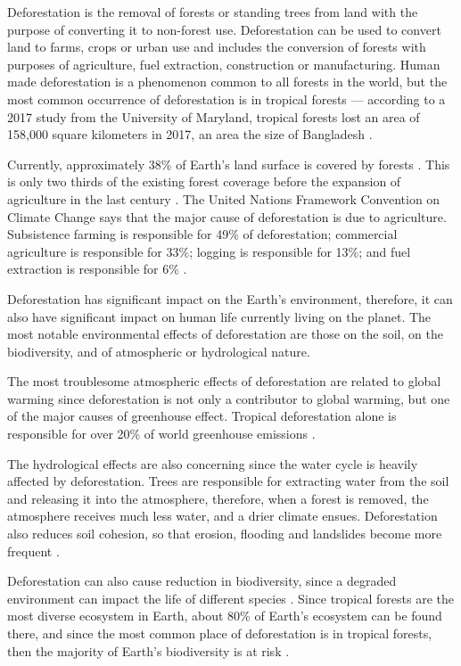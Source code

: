 Deforestation is the removal of forests or standing trees from land
with the purpose of converting it to non-forest use. Deforestation can be used to convert land to farms,
crops or urban use and includes the conversion of forests with purposes of agriculture, fuel extraction,
construction or manufacturing. Human made deforestation is a phenomenon common to all forests in the world, but
the most common occurrence of deforestation is in tropical forests \cite{Alina} --- according to a 2017 study from the University of Maryland,
tropical forests lost an area of 158,000 square kilometers in 2017, an area the size of Bangladesh \cite{maryland}.

Currently, approximately 38\% of Earth's land surface is covered by forests \cite{WWF}. This is only two thirds of the existing
forest coverage before the expansion of agriculture in the last century \cite{WID}. The United Nations Framework Convention on Climate Change
says that the major cause of deforestation is due to agriculture. Subsistence farming is responsible for 49\% of deforestation; commercial agriculture
is responsible for 33\%; logging is responsible for 13\%; and fuel extraction is responsible for 6\% \cite{UNFCCC}.

Deforestation has significant impact on the Earth's environment, therefore, it can also have significant impact on human life currently living on the planet.
The most notable environmental effects of deforestation are those on the soil, on the biodiversity, and of atmospheric or hydrological nature.

The most troublesome atmospheric effects of deforestation are related to global warming since deforestation is not only a contributor to global warming, but
one of the major causes of greenhouse effect. Tropical deforestation alone is responsible for over 20\% of world greenhouse emissions \cite{Chirac}.

The hydrological effects are also concerning since the water cycle is heavily affected by deforestation. Trees are responsible for extracting water from the soil
and releasing it into the atmosphere, therefore, when a forest is removed, the atmosphere receives much less water, and a drier climate ensues. Deforestation also reduces soil cohesion,
so that erosion, flooding and landslides become more frequent \cite{Rogge}.

Deforestation can also cause reduction in biodiversity, since a degraded environment can impact the life of different species \cite{umich}. Since
tropical forests are the most diverse ecosystem in Earth, about 80\% of Earth's ecosystem can be found there, and since the most common place of deforestation
is in tropical forests, then the majority of Earth's biodiversity is at risk \cite{Mogato}.

